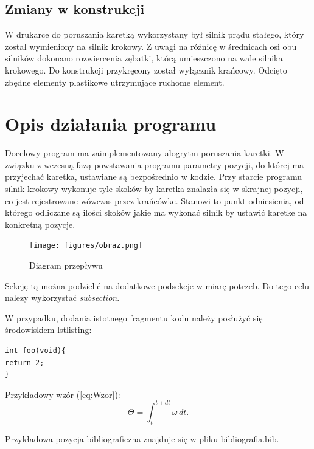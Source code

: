 \documentclass[10pt, a4paper]{article}
\begin{document}
\subsection{Zmiany w konstrukcji}
W drukarce do poruszania karetką wykorzystany był silnik prądu stałego, który został wymieniony na silnik krokowy. Z uwagi na różnicę w średnicach osi obu silników dokonano rozwiercenia zębatki, którą umieszczono na wale silnika krokowego. Do konstrukcji przykręcony został wyłącznik krańcowy.
Odcięto zbędne elementy plastikowe utrzymujące ruchome element.




\section{Opis działania programu}

Docelowy program ma zaimplementowany alogrytm poruszania karetki. W związku z wczesną fazą powstawania programu parametry pozycji, do której ma przyjechać karetka, ustawiane są bezpośrednio w kodzie. Przy starcie programu silnik krokowy wykonuje tyle skoków by karetka znalazła się w skrajnej pozycji, co jest rejestrowane wówczas przez krańcówke. Stanowi to punkt odniesienia, od którego odliczane są ilości skoków jakie ma wykonać silnik by ustawić karetke na konkretną pozycje. 

\begin{figure}[H]
	\centering
	\texttt{[image: figures/obraz.png]}
	\caption{Diagram przepływu}
	\label{fig:Program}
\end{figure}

Sekcję tą można podzielić na dodatkowe podsekcje w miarę potrzeb. 
Do tego celu nalezy wykorzystać \textit{subsection}.

W przypadku, dodania istotnego fragmentu kodu należy posłużyć się środowiskiem 
lstlisting:

\begin{lstlisting}[tabsize=2]
int foo(void){
return 2;
}
\end{lstlisting}

Przykładowy wzór (\ref{eq:Wzor}):
\begin{equation}
\label{eq:Wzor}
\Theta = \int_t^{t+dt} \omega \, dt.	
\end{equation}

Przykładowa pozycja bibliograficzna \cite{SR01} znajduje się 
w pliku bibliografia.bib.

\end{document}
